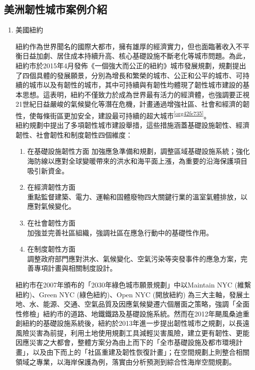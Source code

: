 \documentclass[a4paper,12pt]{article}
\begin{document}
\subsection{美洲韌性城市案例介紹}
\label{sec:orge3bd117}
\begin{enumerate}
\item 美國紐約
\label{sec:org2b62c24}

紐約作為世界聞名的國際大都市，擁有雄厚的經濟實力，但也面臨著收入不平衡日益加劇、居住成本持續升高、核心基礎設施不斷老化等城市問題。為此，紐約市於2015年4月發佈《一個強大而公正的紐約》城市發展規劃，規劃提出了四個具體的發展願景，分別為增長和繁榮的城市、公正和公平的城市、可持續的城市以及有韌性的城市，其中可持續與有韌性均體現了韌性城市建設的基本思想。這表明，紐約不僅致力於成為世界最有活力的經濟體，也強調要正視21世紀日益嚴峻的氣候變化等潛在危機，計畫通過增強社區、社會和經濟的韌性，使每條街區更加安全，建設最可持續的超大城市\textsuperscript{\ref{org42fe735}}。\\

紐約規劃中提出了多項韌性城市建設舉措，這些措施涵蓋基礎設施韌性、經濟韌性、社會韌性和制度韌性四個維度：\\
\begin{enumerate}
\item 在基礎設施韌性方面 加強應急準備和規劃，調整區域基礎設施系統；強化海防線以應對全球變暖帶來的洪水和海平面上漲，為重要的沿海保護項目吸引新資金。\\
\item 在經濟韌性方面\\
重點監督建築、電力、運輸和固體廢物四大關鍵行業的溫室氣體排放，以應對氣候變化。\\
\item 在社會韌性方面\\
加強並完善社區組織，強調社區在應急行動中的基礎性作用。\\
\item 在制度韌性方面\\
調整政府部門應對洪水、氣候變化、空氣污染等突發事件的應急方案，完善專項計畫與相關制度設計。\\
\end{enumerate}

紐約市在2007年頒布的「2030年綠色城市願景規劃」中以Maintain NYC (維繫紐約)、Green NYC (綠色紐約)、Open NYC (開放紐約) 為三大主軸，發展土地、水、能源、交通、空氣品質及因應氣候變遷六個層面之策略，強調「全面性修檢」紐約市的道路、地鐵鐵路及基礎設施系統。然而在2012年颶風桑迪重創紐約的基礎設施系統後，紐約於2013年進⼀步提出韌性城市之規劃，以⻑遠風險災害為前提，利用土地使用規劃工具減輕災害風險，建立更有韌性、更能因應災害之大都會，整體方案分為由上而下的「全市基礎設施及都市環境計畫」，以及由下而上的「社區重建及韌性恢復計畫」；在空間規劃上則整合相關領域之專業，以海岸保護為例，落實由分析預測到綜合性海岸空間規劃。\\


\end{enumerate}
\end{document}
